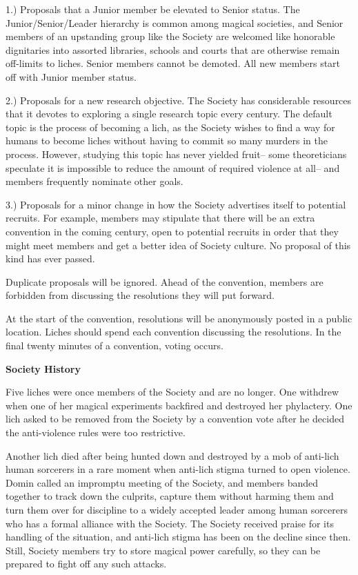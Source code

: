 \documentclass[blue]{Sel}
\begin{document}
1.) Proposals that a Junior member be elevated to Senior status. The Junior/Senior/Leader hierarchy is common among magical societies, and Senior members of an upstanding group like the Society are welcomed like honorable dignitaries into assorted libraries, schools and courts that are otherwise remain off-limits to liches. Senior members cannot be demoted. All new members start off with Junior member status.

2.) Proposals for a new research objective. The Society has considerable resources that it devotes to exploring a single research topic every century. The default topic is the process of becoming a lich, as the Society wishes to find a way for humans to become liches without having to commit so many murders in the process. However, studying this topic has never yielded fruit-- some theoreticians speculate it is impossible to reduce the amount of required violence at all-- and members frequently nominate other goals.

3.) Proposals for a minor change in how the Society advertises itself to potential recruits. For example, members may stipulate that there will be an extra convention in the coming century, open to potential recruits in order that they might meet members and get a better idea of Society culture. No proposal of this kind has ever passed.

Duplicate proposals will be ignored. Ahead of the convention, members are forbidden from discussing the resolutions they will put forward.

At the start of the convention, resolutions will be anonymously posted in a public location. Liches should spend each convention discussing the resolutions. In the final twenty minutes of a convention, voting occurs.

\textbf{Society History}

Five liches were once members of the Society and are no longer. One withdrew when one of her magical experiments backfired and destroyed her phylactery. One lich asked to be removed from the Society by a convention vote after he decided the anti-violence rules were too restrictive. 

Another lich died after being hunted down and destroyed by a mob of anti-lich human sorcerers in a rare moment when anti-lich stigma turned to open violence. Domin called an impromptu meeting of the Society, and members banded together to track down the culprits, capture them without harming them and turn them over for discipline to a widely accepted leader among human sorcerers who has a formal alliance with the Society. The Society received praise for its handling of the situation, and anti-lich stigma has been on the decline since then. Still, Society members try to store magical power carefully, so they can be prepared to fight off any such attacks.
\end{document}

